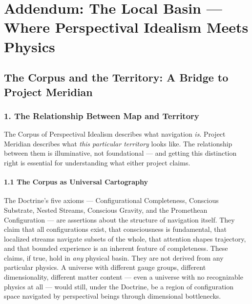 \section*{Addendum: The Local Basin — Where Perspectival Idealism Meets Physics}


\subsection*{The Corpus and the Territory: A Bridge to Project Meridian}



\bigskip\noindent\makebox[\textwidth]{\color{rulegray}\rule{5cm}{0.3pt}}\bigskip


\subsubsection*{1. The Relationship Between Map and Territory}


The Corpus of Perspectival Idealism describes what navigation \textit{is}. Project Meridian describes what \textit{this particular territory} looks like. The relationship between them is illuminative, not foundational — and getting this distinction right is essential for understanding what either project claims.


\paragraph*{1.1 The Corpus as Universal Cartography}


The Doctrine's five axioms — Configurational Completeness, Conscious Substrate, Nested Streams, Conscious Gravity, and the Promethean Configuration — are assertions about the structure of navigation itself. They claim that all configurations exist, that consciousness is fundamental, that localized streams navigate subsets of the whole, that attention shapes trajectory, and that bounded experience is an inherent feature of completeness. These claims, if true, hold in \textit{any} physical basin. They are not derived from any particular physics. A universe with different gauge groups, different dimensionality, different matter content — even a universe with no recognizable physics at all — would still, under the Doctrine, be a region of configuration space navigated by perspectival beings through dimensional bottlenecks.


